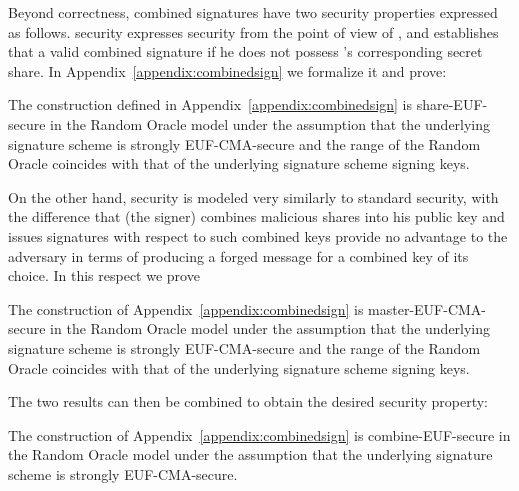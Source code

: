   Beyond correctness, combined signatures have two security properties expressed
  as follows.  security expresses security from the
  point of view of \alice{}, and establishes that \bob{}  a
  valid combined signature if he does not possess \alice's corresponding secret
  share. In Appendix~\ref{appendix:combinedsign} we formalize it and prove:

  \begin{lemma}
    \label{lemma:comb:share}
    The construction defined in Appendix~\ref{appendix:combinedsign} is
    \textsf{share-EUF}-secure in the Random Oracle model under the assumption
    that the underlying signature scheme is strongly \textsf{EUF-CMA}-secure and
    the range of the Random Oracle coincides with that of the underlying
    signature scheme signing keys.
  \end{lemma}

  On the other hand,  security is modeled very
  similarly to standard  security, with the difference
  that \bob{} (the signer) combines malicious shares into his public key and
  issues signatures with respect to such combined keys provide no advantage to the adversary
  in terms of producing a forged message for a combined key of its choice. In
  this respect we prove\redden{:}

  \begin{lemma}
    \label{lemma:comb:master}
    The construction of Appendix~\ref{appendix:combinedsign} is
    \textsf{master-EUF-CMA}-secure in the Random Oracle model under the
    assumption that the underlying signature scheme is strongly
    \textsf{EUF-CMA}-secure and the range of the Random Oracle coincides with
    that of the underlying signature scheme signing keys.
  \end{lemma}

  The two results can then be combined to obtain the desired security property:

  \begin{theorem}
    \label{thm:combsign}
    The construction of Appendix~\ref{appendix:combinedsign} is
    \textsf{combine-EUF}-secure in the Random Oracle model under the assumption
    that the underlying signature scheme is strongly \textsf{EUF-CMA}-secure.
  \end{theorem}
